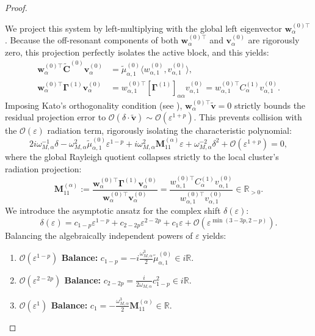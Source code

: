 \documentclass[11pt,a4paper]{article}
\numberwithin{equation}{section}
\begin{document}
\begin{proof}
\begin{enumerate}
We project this system by left-multiplying with the global left eigenvector $\mathbf{w}_\alpha^{(0)\top}$. Because the off-resonant components of both $\mathbf{w}_\alpha^{(0)\top}$ and $\mathbf{v}_\alpha^{(0)}$ are rigorously zero, this projection perfectly isolates the active block, and this yields:
\begin{align*}
    \mathbf{w}_\alpha^{(0)\top} \widetilde{\mathbf{C}}^{(0)} \mathbf{v}_\alpha^{(0)} &= \widetilde{\mu}_{\alpha, 1}^{(0)} \langle w_{\alpha, 1}^{(0)}, v_{\alpha, 1}^{(0)} \rangle, \\
    \mathbf{w}_\alpha^{(0)\top} \mathbf{\Gamma}^{(1)} \mathbf{v}_\alpha^{(0)} &= w_{\alpha, 1}^{(0)\top} [\mathbf{\Gamma}^{(1)}]_{\alpha\alpha} v_{\alpha, 1}^{(0)} = w_{\alpha, 1}^{(0)\top} C_\alpha^{(1)} v_{\alpha, 1}^{(0)}.
\end{align*}
Imposing Kato's orthogonality condition (see \cite[Chap. II, Sec. 3.3]{kato1995perturbation}), $\mathbf{w}_\alpha^{(0)\top} \tilde{\mathbf{v}} = 0$ strictly bounds the residual projection error to $\mathcal{O}(\delta \cdot \tilde{\mathbf{v}}) \sim \mathcal{O}(\varepsilon^{1+p})$. This prevents collision with the $\mathcal{O}(\varepsilon)$ radiation term, rigorously isolating the characteristic polynomial:
$$ 2i\omega_{M,\alpha}^{-1} \delta - \omega_{M,\alpha}^2 \widetilde{\mu}_{\alpha, 1}^{(0)} \varepsilon^{1-p} + i\omega_{M,\alpha}^2 \mathbf{M}_{11}^{(\alpha)} \varepsilon + \omega_{M,\alpha}^{-2}\delta^2 + \mathcal{O}(\varepsilon^{1+p}) = 0, $$
where the global Rayleigh quotient collapses strictly to the local cluster's radiation projection:
$$ \mathbf{M}_{11}^{(\alpha)} := \frac{\mathbf{w}_\alpha^{(0)\top} \mathbf{\Gamma}^{(1)} \mathbf{v}_\alpha^{(0)}}{\mathbf{w}_\alpha^{(0)\top} \mathbf{v}_\alpha^{(0)}} = \frac{w_{\alpha, 1}^{(0)\top} C_\alpha^{(1)} v_{\alpha, 1}^{(0)}}{w_{\alpha, 1}^{(0)\top} v_{\alpha, 1}^{(0)}} \in \mathbb{R}_{>0}. $$
We introduce the asymptotic ansatz for the complex shift $\delta(\varepsilon):$ $$\delta(\varepsilon) = c_{1-p} \varepsilon^{1-p} + c_{2-2p} \varepsilon^{2-2p} + c_1 \varepsilon + \mathcal{O}(\varepsilon^{\min(3-3p, 2-p)}).$$ Balancing the algebraically independent powers of $\varepsilon$ yields:
\begin{enumerate}
    \item \textbf{$\mathcal{O}(\varepsilon^{1-p})$ Balance:} $c_{1-p} = -i \frac{\omega_{M,\alpha}^3}{2} \widetilde{\mu}_{\alpha, 1}^{(0)} \in i\mathbb{R}.$
    \item \textbf{$\mathcal{O}(\varepsilon^{2-2p})$ Balance:} $c_{2-2p} = \frac{i}{2\omega_{M,\alpha}} c_{1-p}^2 \in i\mathbb{R}.$
    \item \textbf{$\mathcal{O}(\varepsilon^1)$ Balance:} $c_1 = - \frac{\omega_{M,\alpha}^3}{2} \mathbf{M}_{11}^{(\alpha)} \in \mathbb{R}.$
\end{enumerate}


\end{enumerate}
\end{proof}
\end{document}
